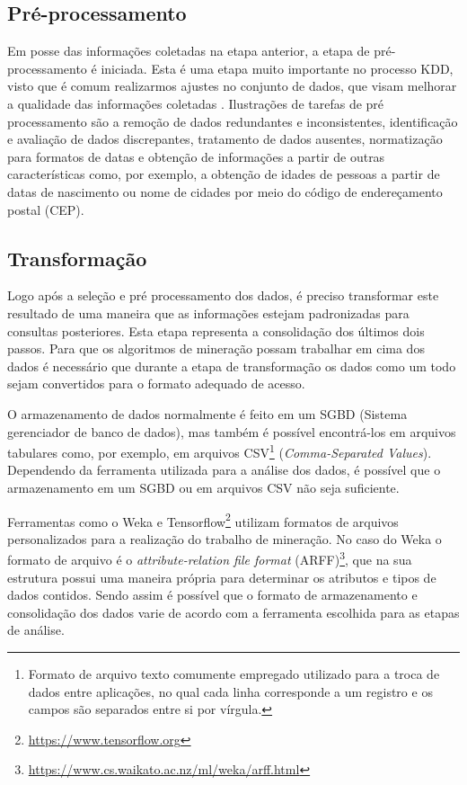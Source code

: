 \subsection{Pré-processamento}

Em posse das informações coletadas na etapa anterior, a etapa de  pré-processamento é iniciada. Esta é uma etapa muito importante no processo KDD, visto que é comum realizarmos ajustes no conjunto de dados, que visam melhorar a qualidade das informações coletadas \cite{Aggarwal2015}. Ilustrações de tarefas de pré processamento são a remoção de dados redundantes e inconsistentes, identificação e avaliação de dados discrepantes, tratamento de dados ausentes, normatização para formatos de datas e obtenção de informações a partir de outras características como, por exemplo, a obtenção de idades de pessoas a partir de datas de nascimento ou nome de cidades por meio do código de endereçamento postal (CEP).

\subsection{Transformação}

Logo após a seleção e pré processamento dos dados, é preciso transformar este resultado de uma maneira que as informações estejam padronizadas para consultas posteriores. Esta etapa representa a consolidação dos últimos dois passos. Para que os algoritmos de mineração possam trabalhar em cima dos dados é necessário que durante a etapa de transformação os dados como um todo sejam convertidos para o formato adequado de acesso.

O armazenamento de dados normalmente é feito em um SGBD (Sistema gerenciador de banco de dados), mas também é possível encontrá-los  em arquivos tabulares como, por exemplo, em arquivos CSV\footnote{Formato de arquivo texto comumente empregado utilizado para a troca de dados entre aplicações, no qual cada linha corresponde a um registro e os campos são separados entre si por vírgula.} (\emph{Comma-Separated Values}). Dependendo da ferramenta utilizada para a análise dos dados, é possível que o armazenamento em um SGBD ou em arquivos CSV não seja suficiente.

Ferramentas como o Weka \cite{Hall2009} e Tensorflow\footnote{\url{https://www.tensorflow.org}} utilizam formatos de arquivos personalizados para a realização do trabalho de mineração. No caso do Weka o formato de arquivo é o \emph{attribute-relation file format} (ARFF)\footnote{\url{https://www.cs.waikato.ac.nz/ml/weka/arff.html}}, que na sua estrutura possui uma maneira própria para determinar os atributos e tipos de dados contidos. Sendo assim é possível que o formato de armazenamento e consolidação dos dados varie de acordo com a ferramenta escolhida para as etapas de análise.


